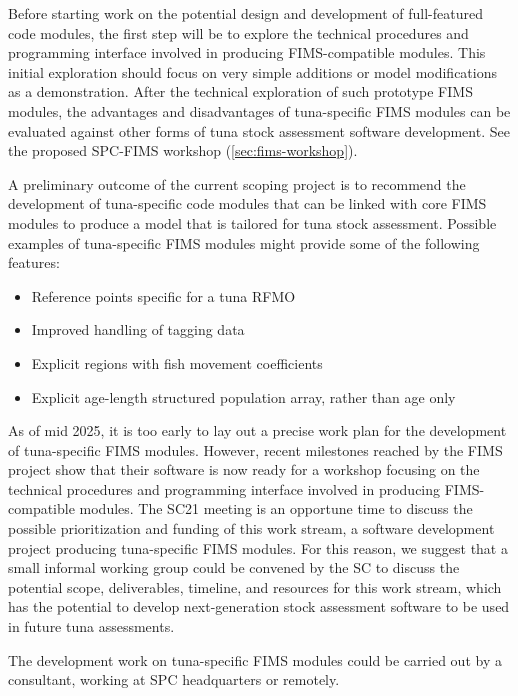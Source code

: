 \documentclass{SCreport}
\begin{document}
Before starting work on the potential design and development of full-featured
code modules, the first step will be to explore the technical procedures and
programming interface involved in producing FIMS-compatible modules. This
initial exploration should focus on very simple additions or model modifications
as a demonstration. After the technical exploration of such prototype FIMS
modules, the advantages and disadvantages of tuna-specific FIMS modules can be
evaluated against other forms of tuna stock assessment software development. See
the proposed SPC-FIMS workshop (\autoref{sec:fims-workshop}).

A preliminary outcome of the current scoping project is to recommend the
development of tuna-specific code modules that can be linked with core FIMS
modules to produce a model that is tailored for tuna stock assessment. Possible
examples of tuna-specific FIMS modules might provide some of the following
features:

\begin{itemize}
  \item Reference points specific for a tuna RFMO\\[-4.5ex]
  \item Improved handling of tagging data\\[-4.5ex]
  \item Explicit regions with fish movement coefficients\\[-4.5ex]
  \item Explicit age-length structured population array, rather than age only
\end{itemize}

As of mid 2025, it is too early to lay out a precise work plan for the
development of tuna-specific FIMS modules. However, recent milestones reached by
the FIMS project show that their software is now ready for a workshop focusing
on the technical procedures and programming interface involved in producing
FIMS-compatible modules. The SC21 meeting is an opportune time to discuss the
possible prioritization and funding of this work stream, a software development
project producing tuna-specific FIMS modules. For this reason, we suggest that a
small informal working group could be convened by the SC to discuss the
potential scope, deliverables, timeline, and resources for this work stream,
which has the potential to develop next-generation stock assessment software to
be used in future tuna assessments.

The development work on tuna-specific FIMS modules could be carried out by a
consultant, working at SPC headquarters or remotely.
\end{document}
